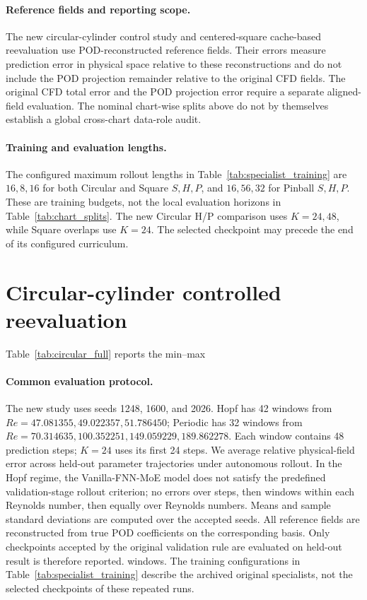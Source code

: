 \documentclass{article}
\providecommand{\DIFaddtex}[1]{{\protect\color{blue} \sf #1}} %
\providecommand{\DIFdeltex}[1]{{\protect\color{red} \scriptsize #1}} %
\providecommand{\DIFaddbegin}{} %
\providecommand{\DIFaddend}{} %
\providecommand{\DIFdelbegin}{} %
\providecommand{\DIFdelend}{} %
\providecommand{\DIFadd}[1]{\texorpdfstring{\DIFaddtex{#1}}{#1}} %
\providecommand{\DIFdel}[1]{\texorpdfstring{\DIFdeltex{#1}}{}} %
\begin{document}
\paragraph{\DIFadd{Reference fields and reporting scope.}}
\DIFadd{The new circular-cylinder control study and centered-square cache-based
reevaluation use POD-reconstructed reference fields. Their errors measure
prediction error in physical space relative to these reconstructions and
do not include the POD projection remainder relative to the original CFD
fields. The original CFD total error and the POD projection error require
a separate aligned-field evaluation. The nominal chart-wise splits above
do not by themselves establish a global cross-chart data-role audit.
}

\paragraph{\DIFadd{Training and evaluation lengths.}}
\DIFadd{The configured maximum rollout lengths in Table~\ref{tab:specialist_training}
are $16,8,16$ for both Circular and Square $S,H,P$, and $16,56,32$ for
Pinball $S,H,P$. These are training budgets, not the local evaluation
horizons in Table~\ref{tab:chart_splits}. The new Circular H/P comparison
uses $K=24,48$, while Square overlaps use $K=24$. The selected checkpoint
may precede the end of its configured curriculum.
}

\section{\DIFadd{Circular-cylinder controlled reevaluation}}
\DIFaddend \label{app:circular}
\DIFdelbegin %

\DIFdel{Table~\ref{tab:circular_full} reports the min--max }\DIFdelend \DIFaddbegin 

\paragraph{\DIFadd{Common evaluation protocol.}}
\DIFadd{The new study uses seeds 1248, 1600, and 2026. Hopf has 42 windows
from $Re=47.081355,49.022357,51.786450$; Periodic has 32 windows from
$Re=70.314635,100.352251,149.059229,189.862278$. Each window contains
48 prediction steps; $K=24$ uses its first 24 steps. We average relative
}\DIFaddend physical-field \DIFdelbegin \DIFdel{error across held-out parameter trajectories under autonomous rollout.
In the Hopf regime, the Vanilla-FNN-MoE model does not satisfy the predefined validation-stage rollout criterion; no }\DIFdelend \DIFaddbegin \DIFadd{errors over steps, then windows within each Reynolds
number, then equally over Reynolds numbers. Means and sample standard
deviations are computed over the accepted seeds. All reference fields
are reconstructed from true POD coefficients on the corresponding basis.
Only checkpoints accepted by the original validation rule are evaluated
on }\DIFaddend held-out \DIFdelbegin \DIFdel{result is therefore reported. }\DIFdelend \DIFaddbegin \DIFadd{windows. The training configurations in
Table~\ref{tab:specialist_training} describe the archived original
specialists, not the selected checkpoints of these repeated runs.
}\DIFaddend 
\end{document}

